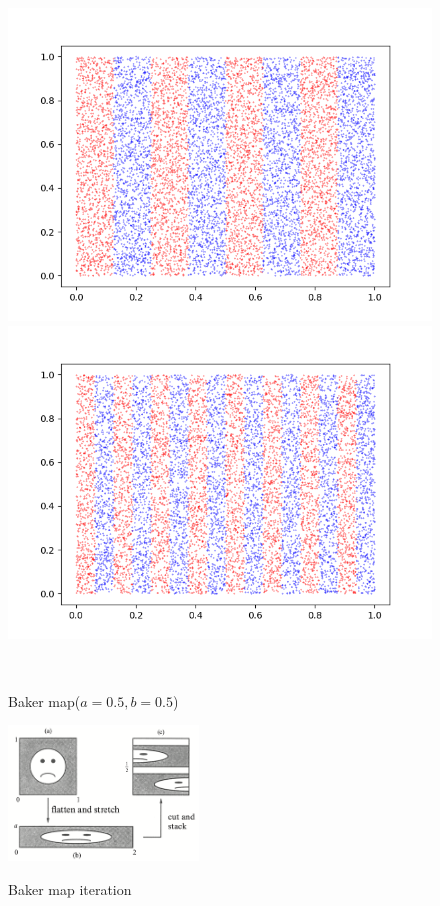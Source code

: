 \documentclass[12pt]{article}
\theoremstyle{plain}
\begin{document}
\begin{figure}[H]
\begin{minipage}[c][0.24\width]{
   0.24\textwidth}
   \includegraphics[width=1\textwidth]{figure/section5/baker-2-0*5-0*5.png}
\end{minipage}
\begin{minipage}[c][0.24\width]{
   0.24\textwidth}
   \centering
   \includegraphics[width=1\textwidth]{figure/section5/baker-3-0*5-0*5.png}
\end{minipage}
\\[2ex]\caption{Baker map($a = 0.5, b = 0.5$)}
\end{figure}


\begin{figure}[H]
\begin{center}
\includegraphics[width=0.45\textwidth]{figure/section5/baker-intro.png} \\
\end{center}
\caption{Baker map iteration}
\end{figure}
\end{document}
